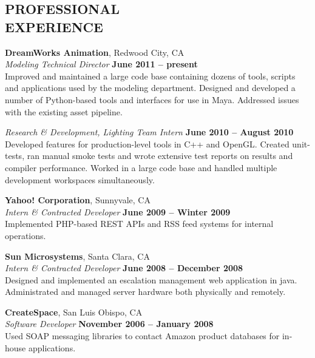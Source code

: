 \documentclass[margin,line]{resume}
\begin{document}
\begin{resume}
    \section{\mysidestyle \textbf{\large{P}\small{ROFESSIONAL\\EXPERIENCE}}}

    \textbf{\listing DreamWorks Animation}, Redwood City, CA \vspace{2mm}\\\vspace{1mm}%
    \textsl{Modeling Technical Director} \hfill \textbf{June 2011 -- present}\\
    Improved and maintained a large code base containing dozens of tools, scripts and applications used by the modeling department.
    Designed and developed a number of Python-based tools and interfaces for use in Maya.  Addressed issues with the existing asset pipeline. \vspace{1mm}

    \textsl{Research \& Development, Lighting Team Intern} \vspace{2mm}\hfill \textbf{June 2010 -- August 2010}\\
    Developed features for production-level tools in C++ and OpenGL.
    Created unit-tests, ran manual smoke tests and wrote extensive test reports on results and compiler performance.
    Worked in a large code base and handled multiple development workspaces simultaneously.

    \textbf{\listing Yahoo! Corporation}, Sunnyvale, CA \vspace{2mm}\\\vspace{1mm}%
    \textsl{Intern \& Contracted Developer} \hfill \textbf{June 2009 -- Winter 2009}\\
    Implemented PHP-based REST APIs and RSS feed systems for internal operations.

    \textbf{\listing Sun Microsystems}, Santa Clara, CA \vspace{2mm}\\\vspace{1mm}%
    \textsl{Intern \& Contracted Developer} \hfill \textbf{June 2008 -- December 2008}\\
    Designed and implemented an escalation management web application in java.
    Administrated and managed server hardware both physically and remotely.

    \textbf{\listing CreateSpace}, San Luis Obispo, CA \vspace{2mm}\\\vspace{1mm}%
    \textsl{Software Developer} \hfill \textbf{November 2006 -- January 2008}\\
    Used SOAP messaging libraries to contact Amazon product databases for in-house applications.
    


\end{resume}
\end{document}
